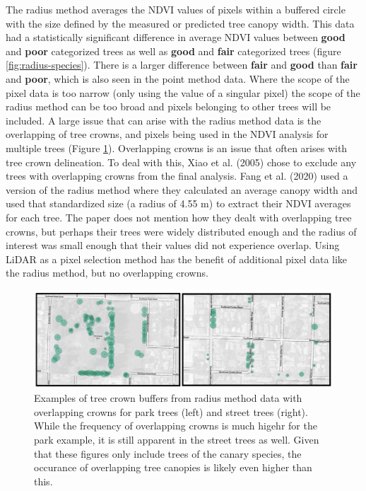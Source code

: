 \documentclass[12pt,twoside]{reedthesis}
\begin{document}
The radius method averages the NDVI values of pixels within a buffered
circle with the size defined by the measured or predicted tree canopy
width. This data had a statistically significant difference in average
NDVI values between \textbf{good} and \textbf{poor} categorized trees as well as
\textbf{good} and \textbf{fair} categorized trees (figure
\ref{fig:radius-species}). There is a larger difference between
\textbf{fair} and \textbf{good} than \textbf{fair} and \textbf{poor}, which is also seen in
the point method data. Where the scope of the pixel data is too narrow
(only using the value of a singular pixel) the scope of the radius
method can be too broad and pixels belonging to other trees will be
included. A large issue that can arise with the radius method data is
the overlapping of tree crowns, and pixels being used in the NDVI
analysis for multiple trees (Figure \ref{fig:overlap-crowns}).
Overlapping crowns is an issue that often arises with tree crown
delineation. To deal with this, Xiao et al. (2005) chose to exclude any trees
with overlapping crowns from the final analysis. Fang et al. (2020) used a
version of the radius method where they calculated an average canopy
width and used that standardized size (a radius of 4.55 m) to extract
their NDVI averages for each tree. The paper does not mention how they
dealt with overlapping tree crowns, but perhaps their trees were widely
distributed enough and the radius of interest was small enough that
their values did not experience overlap. Using LiDAR as a pixel
selection method has the benefit of additional pixel data like the
radius method, but no overlapping crowns.
\begin{figure}[H]

{\centering \includegraphics[width=1\linewidth,]{figure/overlapping-crowns} 

}

\caption[Examples of overlapping park and street tree crowns.]{Examples of tree crown buffers from radius method data with overlapping crowns for park trees (left) and street trees (right). While the frequency of overlapping crowns is much higehr for the park example, it is still apparent in the street trees as well. Given that these figures only include trees of the canary species, the occurance of overlapping tree canopies is likely even higher than this.}\label{fig:overlap-crowns}
\end{figure}
\end{document}
